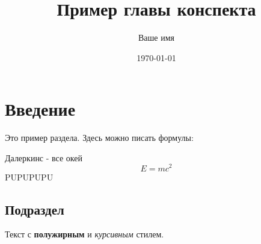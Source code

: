 \documentclass{article}
\title{Пример главы конспекта}
\author{Ваше имя}
\date{\today}
\begin{document}
\maketitle

\section{Введение}
Это пример раздела. Здесь можно писать формулы:

Далеркинс - все окей
\[ E = mc^2 \]
PUPUPUPU
\subsection{Подраздел}
Текст с \textbf{полужирным} и \emph{курсивным} стилем.
\end{document}
